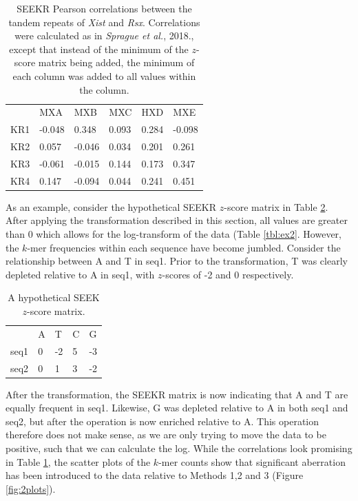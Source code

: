 \begin{table}[ht]
\begin{center}
\begin{tabular}{llllll}
&MXA & MXB                  & MXC                   & HXD                 & MXE                                      \\
KR1 & -0.048 & 0.348    & 0.093 & 0.284  & -0.098 \\
KR2 & 0.057  & -0.046 & 0.034 & 0.201 & 0.261  \\
KR3 & -0.061 & -0.015 & 0.144 & 0.173 & 0.347  \\
KR4 & 0.147   & -0.094  & 0.044 & 0.241 & 0.451 
\end{tabular}
\caption{SEEKR Pearson correlations between the tandem repeats of \emph{Xist} and \emph{Rsx}. Correlations were calculated as in \emph{Sprague et al.}, 2018., except that instead of the minimum of the $z$-score matrix being added, the minimum of each column was added to all values within the column.}
\label{tbl:kmers4}
\end{center}
\end{table}
As an example, consider the hypothetical SEEKR $z$-score matrix in Table \ref{tbl:ex1}. After applying the transformation described in this section, all values are greater than 0 which allows for the log-transform of the data (Table \ref{tbl:ex2}. However, the $k$-mer frequencies within each sequence have become jumbled. Consider the relationship between A and T in seq1. Prior to the transformation, T was clearly depleted relative to A in seq1, with $z$-scores of -2 and 0 respectively. 
\begin{table}[h!]
\begin{center}
\begin{tabular}{lllll}
&A & T                   & C                  & G                                                    \\
seq1 & 0 & -2   & 5  & -3 \\
seq2 & 0   & 1 & 3 & -2 
\end{tabular}
\caption{A hypothetical SEEK $z$-score matrix.}
\label{tbl:ex1}
\end{center}
\end{table}
After the transformation, the SEEKR matrix is now indicating that A and T are equally frequent in seq1. Likewise, G was depleted relative to A in both seq1 and seq2, but after the operation is now enriched relative to A.  This operation therefore does not make sense, as we are only trying to move the data to be positive, such that we can calculate the log. While the correlations look promising in Table \ref{tbl:kmers4}, the scatter plots of the $k$-mer counts show that  significant aberration has been introduced to the data relative to Methods 1,2 and 3 (Figure \ref{fig:2plots}). 


